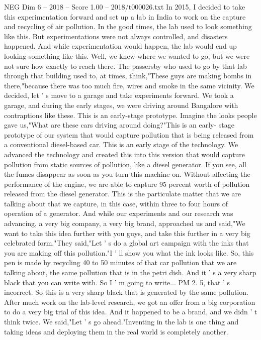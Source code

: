 \begin{textsample}{NEG Dim 6 – 2018 – Score 1.00 – 2018/t000026.txt}
In 2015, I decided to take this experimentation forward and set up a lab in India to work on the capture and recycling of air pollution.
In the good times, the lab used to look something like this.
But experimentations were not always controlled, and disasters happened.
And while experimentation would happen, the lab would end up looking something like this.
Well, we knew where we wanted to go, but we were not sure how exactly to reach there.
The passersby who used to go by that lab through that building used to, at times, think,"These guys are making bombs in there,"because there was too much fire, wires and smoke in the same vicinity.
We decided, let ' s move to a garage and take experiments forward.
We took a garage, and during the early stages, we were driving around Bangalore with contraptions like these.
This is an early-stage prototype.
Imagine the looks people gave us,"What are these cars driving around doing?"This is an early- stage prototype of our system that would capture pollution that is being released from a conventional diesel-based car.
This is an early stage of the technology.
We advanced the technology and created this into this version that would capture pollution from static sources of pollution, like a diesel generator.
If you see, all the fumes disappear as soon as you turn this machine on.
Without affecting the performance of the engine, we are able to capture 95 percent worth of pollution released from the diesel generator.
This is the particulate matter that we are talking about that we capture, in this case, within three to four hours of operation of a generator.
And while our experiments and our research was advancing, a very big company, a very big brand, approached us and said,"We want to take this idea further with you guys, and take this further in a very big celebrated form."They said,"Let ' s do a global art campaign with the inks that you are making off this pollution."I ' ll show you what the ink looks like.
So, this pen is made by recycling 40 to 50 minutes of that car pollution that we are talking about, the same pollution that is in the petri dish.
And it ' s a very sharp black that you can write with.
So I ' m going to write...
PM 2. 5, that ' s incorrect.
So this is a very sharp black that is generated by the same pollution.
After much work on the lab-level research, we got an offer from a big corporation to do a very big trial of this idea.
And it happened to be a brand, and we didn ' t think twice.
We said,"Let ' s go ahead."Inventing in the lab is one thing and taking ideas and deploying them in the real world is completely another.

\end{textsample}
